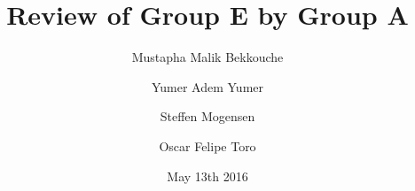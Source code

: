 \documentclass{article}
\title{\huge\sffamily\bfseries Review of Group E by Group A}
\author{ Mustapha Malik Bekkouche \and Yumer Adem Yumer \and Steffen Mogensen \and Oscar Felipe Toro}
\date{May 13th 2016}
\begin{document}
\maketitle


\tableofcontents
\pagebreak









\end{document}

